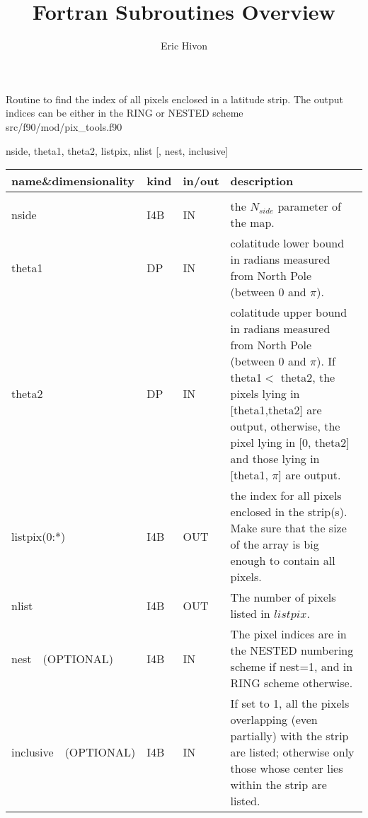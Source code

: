 
\sloppy


\title{\healpix Fortran Subroutines Overview}
 \section[query\_strip]{ }
\label{sub:query_strip}
\author{Eric Hivon}

\begin{facility}
{Routine to find the index of all pixels enclosed in a latitude strip. The output indices can be either in the RING or NESTED scheme} 
{src/f90/mod/pix\_tools.f90}
\end{facility}

\begin{f90format}
{nside, theta1, theta2, listpix, nlist [, nest, inclusive]}
\end{f90format}

\begin{arguments}
{
\begin{tabular}{p{0.25\hsize} p{0.05\hsize} p{0.1\hsize} p{0.5\hsize}} \hline  
\textbf{name\&dimensionality} & \textbf{kind} & \textbf{in/out} & \textbf{description} \\ \hline
                   &   &   &                           \\ %
nside & I4B & IN & the $N_{side}$ parameter of the map. \\
theta1 & DP & IN & colatitude lower bound in radians measured from North Pole
                   (between 0 and $\pi$). \\
theta2 & DP & IN & colatitude upper bound in radians measured from North Pole (between 0 and $\pi$). If
                   theta1$<$ theta2, the pixels lying in [theta1,theta2]
                   are output, otherwise, the pixel lying in [0,
                   theta2] and those lying in [theta1, $\pi$] are output.\\
listpix(0:*) & I4B & OUT & the index for all pixels enclosed in the
                   strip(s). Make sure that the size of the array is big enough to contain all pixels. \\ 
nlist & I4B & OUT & The number of pixels listed in $listpix$. \\
nest\ \ (OPTIONAL) & I4B & IN &  The pixel indices are in the NESTED numbering scheme if nest=1, and in RING scheme otherwise. \\
inclusive\ \ (OPTIONAL) & I4B & IN & If set to 1, all the pixels overlapping
                   (even partially)
                   with the strip are listed; otherwise only those whose
                   center lies within the strip are listed. \\
\end{tabular}
}
\end{arguments}

